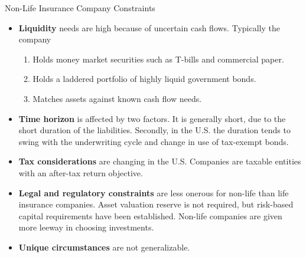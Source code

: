 \documentclass[../custom]{flashcards}
\begin{document}
\begin{flashcard}[\studyArea]{Non-Life Insurance Company Constraints}
    \begin{itemize}
        \item \textbf{Liquidity} needs are high because of uncertain cash flows. Typically the company
            \begin{enumerate}
                \item Holds money market securities such as T-bills and commercial paper.
                \item Holds a laddered portfolio of highly liquid government bonds.
                \item Matches assets against known cash flow needs.
            \end{enumerate}
        \item \textbf{Time horizon} is affected by two factors. It is generally short, due to the short duration of the liabilities. Secondly, in the U.S. the duration tends to swing with the underwriting cycle and change in use of tax-exempt bonds.
        \item \textbf{Tax considerations} are changing in the U.S\@. Companies are taxable entities with an after-tax return objective.
        \item \textbf{Legal and regulatory constraints} are less onerous for non-life than life insurance companies. Asset valuation reserve is not required, but risk-based capital requirements have been established. Non-life companies are given more leeway in choosing investments.
        \item \textbf{Unique circumstances} are not generalizable.
    \end{itemize}
\end{flashcard}
\end{document}
